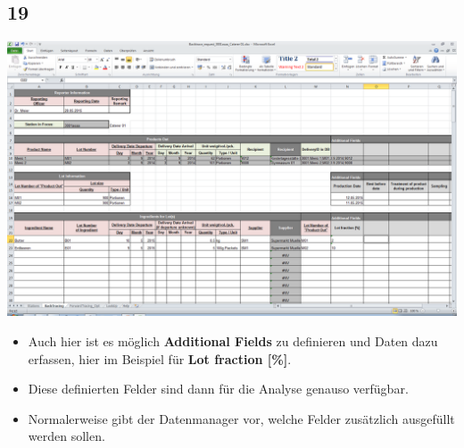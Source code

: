 \documentclass{beamer}
\begin{document}
\subsection{19}
\begin{frame}
	\begin{center}
  		\includegraphics[height=0.6\textheight]{19.png}
	\end{center}
	\begin{itemize}
		\item Auch hier ist es möglich \textbf{Additional Fields} zu definieren und Daten dazu erfassen, hier im Beispiel für \textbf{Lot fraction [\%]}.
		\item Diese definierten Felder sind dann für die Analyse genauso verfügbar.
		\item Normalerweise gibt der Datenmanager vor, welche Felder zusätzlich ausgefüllt werden sollen.
	\end{itemize}
\end{frame}
\end{document}
